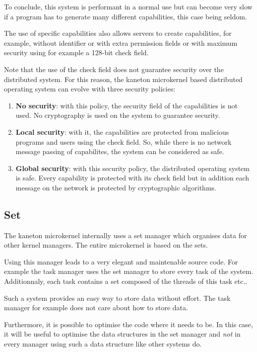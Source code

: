 {\begin{multicols}{2}
To conclude, this system is performant in a normal use but can become
very slow if a program has to generate many different capabilities, this
case being seldom.

The use of specific capabilities also allows servers to create capabilities,
for example, without identifier or with extra permission fields or with
maximum security using for example a 128-bit check field.

Note that the use of the check field does not guarantee security over the
distributed system. For this reason, the kaneton microkernel based
distributed operating system can evolve with three security policies:

\begin{enumerate}
  \item
    \textbf{No security}: with this policy, the security field of the
    capabilities is not used. No cryptography is used on the system
    to guarantee security.
  \item
    \textbf{Local security}: with it, the capabilities are protected from
    malicious programs and users using the check field. So, while there
    is no network message passing of capabilites, the system can be
    considered as safe.
  \item
    \textbf{Global security}: with this security policy, the distributed
    operating system is safe. Every capability is protected with its check
    field but in addition each message on the network is protected by
    cryptographic algorithms.
\end{enumerate}

%
%

\subsection{Set}

The kaneton microkernel internally uses a set manager which organises data
for other kernel managers. The entire microkernel is based on the sets.

Using this manager leads to a very elegant and maintenable source code. For
example the task manager uses the set manager to store every task of the
system. Additionnaly, each task contains a set composed of the threads of
this task etc..

Such a system provides an easy way to store data without effort. The task
manager for example does not care about how to store data.

Furthermore, it is possible to optimise the code where it needs to be. In
this case, it will be useful to optimise the data structures in the set
manager and \textit{not} in every manager using such a data structure like
other systems do.


\end{multicols}}
